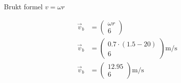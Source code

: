 \subsubsection{}

Brukt formel $v = \omega r$

\begin{align}
\vec{v}_b &= 
\begin{pmatrix} \omega r \\ 6 \end{pmatrix} \\[1em]
\vec{v}_b &= 
\begin{pmatrix} 0.7 \cdot (1.5 - 20) \\ 6 \end{pmatrix} \mathrm{m/s} \\[1em]
\vec{v}_b &= 
\begin{pmatrix} 12.95 \\ 6 \end{pmatrix} \mathrm{m/s}
\end{align}

\newpage